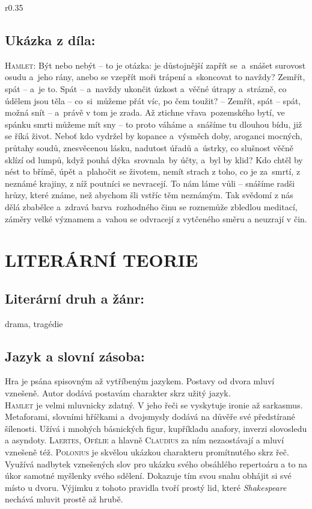 \documentclass[A4paper]{extarticle} %
\begin{document}
\noindent\begin{wrapfigure}{r}{0.35\textwidth}
\tiny\subsection*{Ukázka z díla:}\setlength{\parindent}{3pt}\noindent\textsc{Hamlet:} Být nebo nebýt -- to je otázka:
je důstojnější zapřít se~a~snášet surovost osudu a~jeho rány, anebo se vzepřít moři trápení a~skoncovat to navždy?
Zemřít, spát -- a~je to.
Spát -- a~navždy ukončit úzkost a~věčné útrapy a~strázně, co údělem jsou těla -- co~si~můžeme přát víc, po čem toužit?
-- Zemřít, spát -- spát, možná snít -- a~právě v tom je zrada.
Až ztichne vřava~pozemského bytí, ve spánku smrti můžeme mít sny -- to proto váháme a~snášíme tu dlouhou bídu, již se říká život.
Neboť kdo vydržel by kopance a~výsměch doby, aroganci mocných, průtahy soudů, znesvěcenou lásku, nadutost úřadů a~ústrky, co slušnost věčně sklízí od lumpů, když pouhá dýka~srovnala~by účty, a~byl by klid?
Kdo chtěl by nést to břímě, úpět a~plahočit se životem, nemít strach z toho, co je za~smrtí, z neznámé krajiny, z níž poutníci se nevracejí.
To nám láme vůli -- snášíme radši hrůzy, které známe, než abychom šli vstříc těm neznámým.
Tak svědomí z nás dělá zbabělce a~zdravá barva~rozhodného činu se roznemůže zbledlou meditací, záměry velké významem a~vahou se odvracejí z vytčeného směru a neuzrají v čin.
\end{wrapfigure}

\section*{LITERÁRNÍ TEORIE}

\subsection*{Literární druh a žánr:}
\noindent drama, tragédie


\subsection*{Jazyk a slovní zásoba: }
\noindent Hra je psána spisovným až vytříbeným jazykem.
Postavy od dvora mluví vznešeně.
Autor dodává postavám charakter skrz užitý jazyk. \\
\textsc{Hamlet} je velmi mluvnicky zdatný.
V jeho řeči se vyskytuje ironie až sarkasmus.
Metaforami, slovními hříčkami a~dvojsmysly dodává na důvěře své předstírané šílenosti.
Užívá i mnohých básnických figur, kupříkladu anafory, inverzi slovosledu a asyndoty.
\textsc{Laertes}, \textsc{Ofélie} a hlavně \textsc{Claudius} za ním nezaostávají a mluví vznešeně též.
\textsc{Polonius} je skvělou ukázkou charakteru promítnutého skrz řeč.
Využívá nadbytek vznešených slov pro ukázku svého obsáhlého repertoáru a to na úkor samotné myšlenky svého sdělení.
Dokazuje tím svou snahu obhájit si své místo u dvoru.
Výjimku z tohoto pravidla tvoří prostý lid, které \textit{Shakespeare} nechává mluvit prostě až hrubě.  
\end{document}
